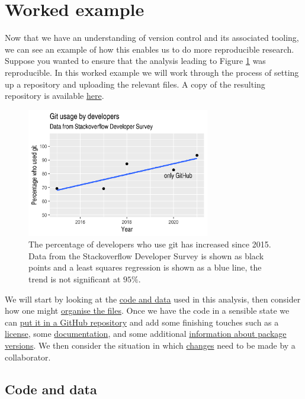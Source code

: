 \documentclass[11pt,onecolumn]{scrartcl}
\begin{document}
\section{Worked example}
\label{sec:orga542221}

Now that we have an understanding of version control and its associated tooling,
we can see an example of how this enables us to do more reproducible research.
Suppose you wanted to ensure that the analysis leading to Figure
\ref{fig:demo-result-1} was reproducible. In this worked example we will work through
the process of setting up a repository and uploading the relevant files. A copy
of the resulting repository is available \href{https://github.com/aezarebski/git-usage}{here}.

\begin{figure}[htbp]
\centering
\includegraphics[width=8cm]{./git-usage-1.png}
\caption{\label{fig:demo-result-1}The percentage of developers who use git has increased since 2015. Data from the Stackoverflow Developer Survey is shown as black points and a least squares regression is shown as a blue line, the trend is not significant at \(95\%\).}
\end{figure}

We will start by looking at the \hyperref[sec:org81b44bf]{code and data} used in this analysis, then
consider how one might \hyperref[sec:org3ae4977]{organise the files}. Once we have the code in a sensible
state we can \hyperref[sec:orgc114d0e]{put it in a GitHub repository} and add some finishing touches such
as a \hyperref[sec:org49ab1a6]{license}, some \hyperref[sec:orgc298b6e]{documentation}, and some additional \hyperref[sec:org53251f3]{information about package
versions}. We then consider the situation in which \hyperref[sec:org654329d]{changes} need to be made by a
collaborator.

\subsection{Code and data}
\label{sec:org81b44bf}
\end{document}
